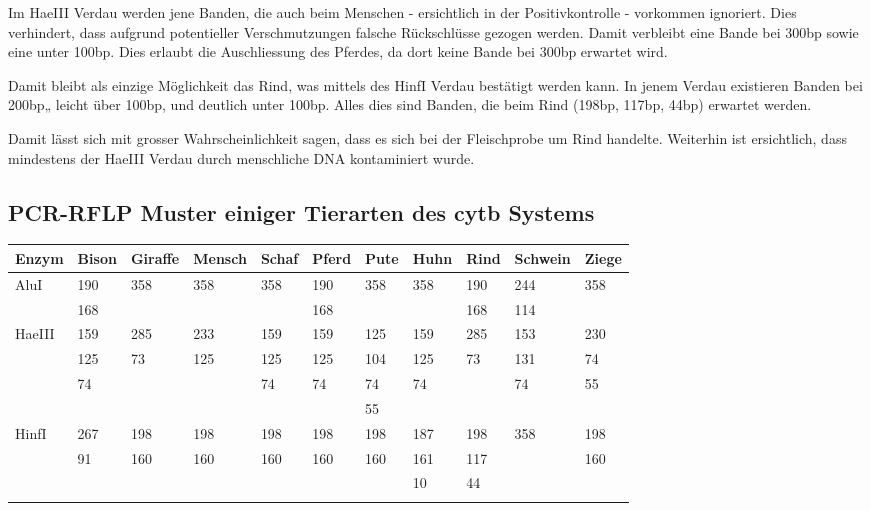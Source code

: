 \documentclass[a4paper,english]{scrreprt}
\begin{document}
Im HaeIII Verdau werden jene Banden, die auch beim Menschen - ersichtlich in
der Positivkontrolle - vorkommen ignoriert. Dies verhindert, dass aufgrund
potentieller Verschmutzungen falsche Rückschlüsse gezogen werden. Damit
verbleibt eine Bande bei 300bp sowie eine unter 100bp. Dies erlaubt die
Auschliessung des Pferdes, da dort keine Bande bei 300bp erwartet wird.

Damit bleibt als einzige Möglichkeit das Rind, was mittels des HinfI Verdau
bestätigt werden kann. In jenem Verdau existieren Banden bei 200bp„ leicht über
100bp, und deutlich unter 100bp. Alles dies sind Banden, die beim Rind (198bp,
117bp, 44bp) erwartet werden.

Damit lässt sich mit grosser Wahrscheinlichkeit sagen, dass es sich bei der
Fleischprobe um Rind handelte. Weiterhin ist ersichtlich, dass mindestens der
HaeIII Verdau durch menschliche DNA kontaminiert wurde.

\subsection{PCR-RFLP Muster einiger Tierarten des cytb Systems}

\begin{tabu}{lllllllllll}
	\toprule
	Enzym  & Bison & Giraffe & Mensch & Schaf & Pferd & Pute & Huhn & Rind & Schwein & Ziege \\
	\midrule
	AluI   & 190   & 358     & 358    & 358   & 190   & 358  & 358  & 190  & 244     & 358 \\
	       & 168   &         &        &       & 168   &      &      & 168  & 114     &     \\
	\midrule
	HaeIII & 159   & 285     & 233    & 159   & 159   & 125  & 159  & 285  & 153     & 230 \\
	       & 125   &  73     & 125    & 125   & 125   & 104  & 125  &  73  & 131     &  74 \\
	       &  74   &         &        &  74   &  74   &  74  &  74  &      &  74     &  55 \\
	       &       &         &        &       &       &  55  &      &      &         &     \\
	\midrule
	HinfI  & 267   & 198     & 198    & 198   & 198   & 198  & 187  & 198  & 358     & 198 \\
	       &  91   & 160     & 160    & 160   & 160   & 160  & 161  & 117  &         & 160 \\
	       &       &         &        &       &       &      &  10  &  44  &         &     \\
	       &       &         &        &       &       &      &      &      &         &     \\
	\bottomrule
\end{tabu}
\end{document}
